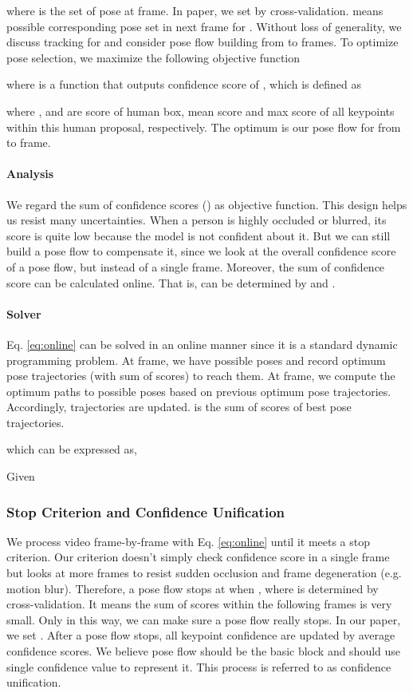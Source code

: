 \documentclass{bmvc2k}
\begin{document}
where  is the set of pose at  frame. In paper, we set  by cross-validation.  means possible corresponding pose set in next frame for . Without loss of generality, we discuss tracking for  and consider pose flow building from  to  frames. To optimize pose selection, we maximize the following objective function
\vspace{-2mm}

where  is a function that outputs confidence score of , which is defined as

where ,  and  are score of human box, mean score and max score of all keypoints within this human proposal, respectively. The optimum  is our pose flow for  from  to  frame.
\vspace{-3mm}

\paragraph{Analysis} We regard the sum of confidence scores () as objective function. This design helps us resist many uncertainties. When a person is highly occluded or blurred, its score is quite low because the model is not confident about it. But we can still build a pose flow to compensate it, since we look at the overall confidence score of a pose flow, but instead of a single frame. Moreover, the sum of confidence score can be calculated online. That is,  can be determined by  and .
\vspace{-4mm}
\paragraph{Solver} Eq. \ref{eq:online} can be solved in an online manner since it is a standard dynamic programming problem. At  frame, we have  possible poses and record  optimum pose trajectories (with sum of scores) to reach them. At  frame, we compute the optimum paths to  possible poses based on previous  optimum pose trajectories. Accordingly,  trajectories are updated.  is the sum of scores of best pose trajectories. 

  which can be expressed as,

Given  
\fi


\subsubsection{Stop Criterion and Confidence Unification} We process video frame-by-frame with Eq. \ref{eq:online} until it meets a stop criterion. Our criterion doesn't simply check confidence score in a single frame but looks at more frames to resist sudden occlusion and frame degeneration (e.g. motion blur). Therefore, a pose flow stops at  when , where  is determined by cross-validation. It means the sum of scores within the following  frames is very small. Only in this way, we can make sure a pose flow really stops. In our paper, we set . After a pose flow stops, all keypoint confidence are updated by average confidence scores. We believe pose flow should be the basic block and should use single confidence value to represent it. This process is referred to as confidence unification.
\vspace{-3mm}
\end{document}
